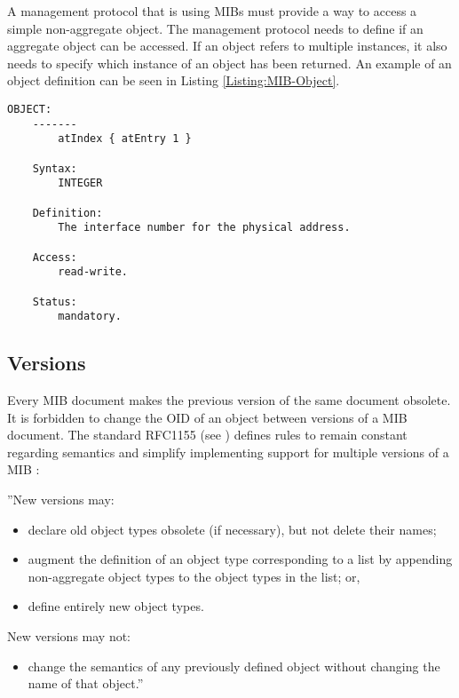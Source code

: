 A management protocol that is using MIBs must provide a way to access a simple non-aggregate object. The management protocol needs to define if an aggregate object can be accessed. If an object refers to multiple instances, it also needs to specify which instance of an object has been returned. An example of an object definition can be seen in Listing \ref{Listing:MIB-Object}.

\pagebreak
\begin{lstlisting}[label=Listing:MIB-Object,captionpos=b,caption={Example of an object definition (taken from \cite{RFC:RFC1155:1990})}]
    OBJECT:
    -------
        atIndex { atEntry 1 }
    
    Syntax:
        INTEGER
    
    Definition:
        The interface number for the physical address.
    
    Access:
        read-write.
    
    Status:
        mandatory.
\end{lstlisting}

\newpage
\subsection{Versions}
\label{Section:MIB-Versions}

Every MIB document makes the previous version of the same document obsolete. It is forbidden to change the OID of an object between versions of a MIB document. The standard RFC1155 (see \cite{RFC:RFC1155:1990}) defines rules to remain constant regarding semantics and simplify implementing support for multiple versions of a MIB \cite{RFC:RFC1155:1990}:

''New versions may:

\begin{minipage}{\textwidth}
\begin{itemize}
    \item declare old object types obsolete (if necessary), but not delete their names;
    \item augment the definition of an object type corresponding to a list by appending non-aggregate object types to the object types in the list; or,
    \item define entirely new object types.
\end{itemize}
\end{minipage}


New versions may not:

\begin{minipage}{\textwidth}
\begin{itemize}
    \item change the semantics of any previously defined object without
    changing the name of that object.''\cite{RFC:RFC1155:1990}
\end{itemize}
\end{minipage}


